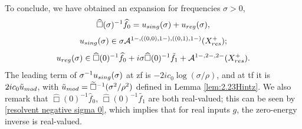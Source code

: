 \documentclass[10pt,a4paper,reqno]{amsart}
\newcommand{\A}{\mathcal{A}}
\newcommand{\ti}{\tilde}
\theoremstyle{definition}
\theoremstyle{remark}
\numberwithin{equation}{section}
\newcommand{\wh}{\widehat}
\begin{document}
To conclude, we have obtained an expansion for frequencies $\sigma>0$,
\begin{equation}
\label{decompose u sing and reg}
    \wh\Box(\sigma)^{-1} \wh{f}_0 = u_{\rm{sing}}(\sigma) + u_{\rm{reg}}(\sigma),
\end{equation}
\begin{equation}
\label{u singular}
    u_{\rm{sing}}(\sigma) \in \sigma\A^{1-,((0,0),1-),((0,1),1-)}(X^+_{\rm res});
\end{equation}
\begin{equation}
\label{u regular}
    u_{\rm{reg}}(\sigma) \in \wh\Box(0)^{-1} \wh{f}_0 + i\sigma \wh\Box(0)^{-1}\ti{f_1} + \A^{1-,2-,2-}(X^+_{\rm res}).
\end{equation}
The leading term of $\sigma^{-1} u_{\rm{sing}}(\sigma)$ at zf is $-2ic_0 \log(\sigma/\rho)$, and at tf it is $2ic_0 \ti u_{\rm mod}$, with $\ti u_{\rm mod} = \widetilde\Box^{-1}(\sigma^2/\rho^2)$ defined in Lemma \ref{lem:2.23Hintz}. We also remark that $\wh\Box(0)^{-1} \wh{f}_0$, $\wh\Box(0)^{-1} \ti{f_1}$ are both real-valued; this can be seen by \eqref{resolvent negative sigma 0}, which implies that for real inputs $g$, the zero-energy inverse is real-valued.
\end{document}
